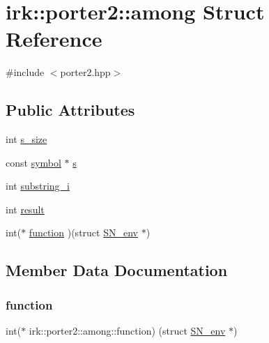 \hypertarget{structirk_1_1porter2_1_1among}{}\section{irk\+:\+:porter2\+:\+:among Struct Reference}
\label{structirk_1_1porter2_1_1among}


{\ttfamily \#include $<$porter2.\+hpp$>$}

\subsection*{Public Attributes}
\begin{DoxyCompactItemize}
\item 
int \mbox{\hyperlink{structirk_1_1porter2_1_1among_a3b5d1e39e7e0562328cc4c0e1cc26aee}{s\+\_\+size}}
\item 
const \mbox{\hyperlink{namespaceirk_1_1porter2_afd04c4eb58a1dabcf8f3ab2d7e9f9ed5}{symbol}} $\ast$ \mbox{\hyperlink{structirk_1_1porter2_1_1among_ae3dd4d724a8c82cb171c3191c2885551}{s}}
\item 
int \mbox{\hyperlink{structirk_1_1porter2_1_1among_a86e77c7286f95656a4339a6af2a51323}{substring\+\_\+i}}
\item 
int \mbox{\hyperlink{structirk_1_1porter2_1_1among_aea899d1cddb710d5a9a7c71dc591dae0}{result}}
\item 
int($\ast$ \mbox{\hyperlink{structirk_1_1porter2_1_1among_aa16d63501690847d93205349a192973a}{function}} )(struct \mbox{\hyperlink{structirk_1_1porter2_1_1SN__env}{S\+N\+\_\+env}} $\ast$)
\end{DoxyCompactItemize}


\subsection{Member Data Documentation}
\mbox{\label{structirk_1_1porter2_1_1among_aa16d63501690847d93205349a192973a}} 
\subsubsection{\texorpdfstring{function}{function}}
{\footnotesize\ttfamily int($\ast$  irk\+::porter2\+::among\+::function) (struct \mbox{\hyperlink{structirk_1_1porter2_1_1SN__env}{S\+N\+\_\+env}} $\ast$)}

